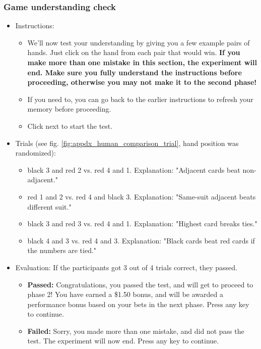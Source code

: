 \subsubsection{Game understanding check}
\begin{itemize}
\item Instructions:
    \begin{itemize}
    \item We'll now test your understanding by giving you a few example pairs of hands. Just click on the hand from each pair that would win. \textbf{\color{red} If you make more than one mistake in this section, the experiment will end. Make sure you fully understand the instructions before proceeding, otherwise you may not make it to the second phase!}
    \item If you need to, you can go back to the earlier instructions to refresh your memory before proceeding.
    \item Click next to start the test.
    \end{itemize}
\item Trials (see fig. \ref{fig:appdx_human_comparison_trial}, hand position was randomized):
    \begin{itemize}
        \item black 3 and red 2 vs. red 4 and 1. Explanation: "Adjacent cards beat non-adjacent." 
        \item red 1 and 2 vs. red 4 and black 3. Explanation: "Same-suit adjacent beats different suit." 
        \item black 3 and red 3 vs. red 4 and 1. Explanation: "Highest card breaks ties." 
        \item black 4 and 3 vs. red 4 and 3. Explanation: "Black cards beat red cards if the numbers are tied." 
    \end{itemize}
\item Evaluation: If the participants got 3 out of 4 trials correct, they passed. 
    \begin{itemize}
        \item \textbf{Passed:} Congratulations, you passed the test, and will get to proceed to phase 2! You have earned a \$1.50 bonus, and will be awarded a performance bonus based on your bets in the next phase. Press any key to continue.
        \item \textbf{Failed:} Sorry, you made more than one mistake, and did not pass the test. The experiment will now end. Press any key to continue.
    \end{itemize}
\end{itemize}

